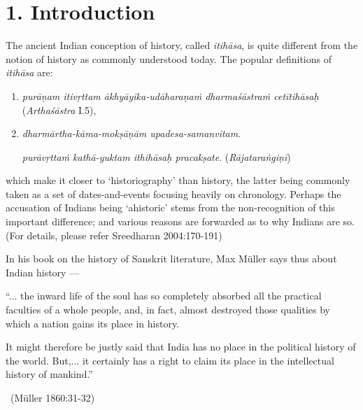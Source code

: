 \section*{1. Introduction}

The ancient Indian conception of history, called \textit{itihāsa}, is quite different from the notion of history as commonly understood today. The popular definitions of \textit{itihāsa} are:

\begin{enumerate}
\itemsep=0pt
\item \textit{purāṇam itivṛttam ākhyāyika-udāharaṇaṁ dharmaśāstraṁ cetītihāsaḥ} (\textit{Arthaśāstra} I.5),

 \item 
 \textit{dharmārtha-kāma-mokṣāṇām upadesa-samanvitam}.

 \textit{purāvṛttaṁ kathā-yuktam ithihāsaḥ pracakṣate}. (\textit{Rājataraṅgiṇī})

\end{enumerate}

which make it closer to ‘historiography’ than history, the latter being commonly taken as a set of dates-and-events focusing heavily on chronology. Perhaps the accusation of Indians being ‘ahistoric’ stems from the non-recognition of this important difference; and various reasons are forwarded as to why Indians are so. (For details, please refer Sreedharan 2004:170-191)

In his book on the history of Sanskrit literature, Max Müller says thus about Indian history —

\begin{myquote}
“... the inward life of the soul has so completely absorbed all the practical faculties of a whole people, and, in fact, almost destroyed those qualities by which a nation gains its place in history.
\end{myquote}

\begin{myquote}
It might therefore be justly said that India has no place in the political history of the world. But,... it certainly has a right to claim its place in the intellectual history of mankind.” 

~\hfill (Müller 1860:31-32)
\end{myquote}

